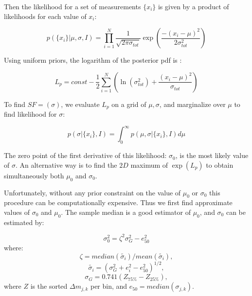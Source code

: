 \documentclass[fleqn,usenatbib]{mnras}  %
\begin{document}
Then the likelihood for a set of measurements $\{x_{i}\}$ is given by a product of likelihoods for each value of $x_{i}$:

\begin{equation}
p(\{ x_{i}\} | \mu, \sigma, I) =  \prod _{i=1}^{N} { \frac{1}{\sqrt{2\pi \sigma_{tot}}} \exp{\left( \frac{-(x_{i}-\mu)^{2}}{2\sigma_{tot}^{2}} \right)}}
\end{equation}

Using uniform priors, the logarithm of the posterior pdf is :

\begin{equation}
\label{eq:logP}
L_{p} = const - \frac{1}{2} \sum_{i=1}^{N} {\left( \ln{(\sigma_{tot}^{2})} + \frac{(x_{i}-\mu)^{2}}{\sigma_{tot}} \right) }
\end{equation}

To find $SF = (\sigma)$, we evaluate $L_{p}$ on a grid of $\mu, \sigma$, and marginalize over $\mu$ to find likelihood for $\sigma$:  

\begin{equation}
p(\sigma|\{ x_{i}\}, I) = \int_{0}^{\infty} {p(\mu,\sigma |\{ x_{i}\}, I )} d \mu
\end{equation}

The zero point of the first derivative of this likelihood: $\sigma_{0}$,  is the most likely value of $\sigma$. An alternative way is to find the $2D$ maximum of $\exp{(L_{p})}$ to obtain simultaneously both $\mu_{0}$ and $\sigma_{0}$.

Unfortunately, without any prior constraint on the value of $\mu_{0}$ or $\sigma_{0}$ this procedure can be  computationally expensive. Thus we first find  approximate values of  $\sigma_{0}$ and $\mu_{0}$.  The sample median is a good estimator of $\mu_{0}$, and $\sigma_{0}$ can be estimated by:

\begin{equation}
\sigma_{0}^{2} = \zeta^{2} \sigma_{G}^{2} - e_{50}^{2}
\end{equation} 
where:
\begin{equation}
\zeta = median(\tilde{\sigma_{i}}) / mean(\tilde{\sigma_{i}}),
\end{equation} 
\begin{equation}
\tilde{\sigma_{i}} = (\sigma_{G}^{2} + e_{i}^{2} - e_{50}^{2})^{1/2},
\end{equation}
\begin{equation}
\sigma_{G} = 0.741 (Z_{75\%} - Z_{25\%}), 
\end{equation}
where $Z$ is the sorted $\Delta m_{j,k}$ per bin, and $e_{50} = median(\sigma_{j,k})$.
\end{document}
